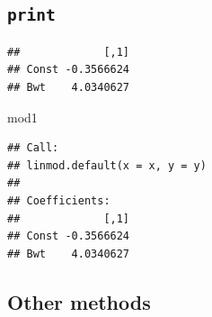 \documentclass[]{book}
\newenvironment{Shaded}{\begin{snugshade}}{\end{snugshade}}
\newcommand{\KeywordTok}[1]{\textcolor[rgb]{0.13,0.29,0.53}{\textbf{#1}}}
\newcommand{\DataTypeTok}[1]{\textcolor[rgb]{0.13,0.29,0.53}{#1}}
\newcommand{\DecValTok}[1]{\textcolor[rgb]{0.00,0.00,0.81}{#1}}
\newcommand{\CharTok}[1]{\textcolor[rgb]{0.31,0.60,0.02}{#1}}
\newcommand{\StringTok}[1]{\textcolor[rgb]{0.31,0.60,0.02}{#1}}
\newcommand{\ControlFlowTok}[1]{\textcolor[rgb]{0.13,0.29,0.53}{\textbf{#1}}}
\newcommand{\OperatorTok}[1]{\textcolor[rgb]{0.81,0.36,0.00}{\textbf{#1}}}
\newcommand{\NormalTok}[1]{#1}
\theoremstyle{definition}
\theoremstyle{definition}
\theoremstyle{definition}
\theoremstyle{remark}
\begin{document}
\subsection{\texorpdfstring{\texttt{print}}{print}}\label{print}

\begin{Shaded}
\end{Shaded}

\begin{Shaded}
\end{Shaded}

\begin{verbatim}
##             [,1]
## Const -0.3566624
## Bwt    4.0340627
\end{verbatim}

\begin{Shaded}
\begin{Highlighting}[]
\NormalTok{mod1}
\end{Highlighting}
\end{Shaded}

\begin{verbatim}
## Call:
## linmod.default(x = x, y = y)
## 
## Coefficients:
##             [,1]
## Const -0.3566624
## Bwt    4.0340627
\end{verbatim}

\subsection{Other methods}\label{other-methods}
\end{document}
